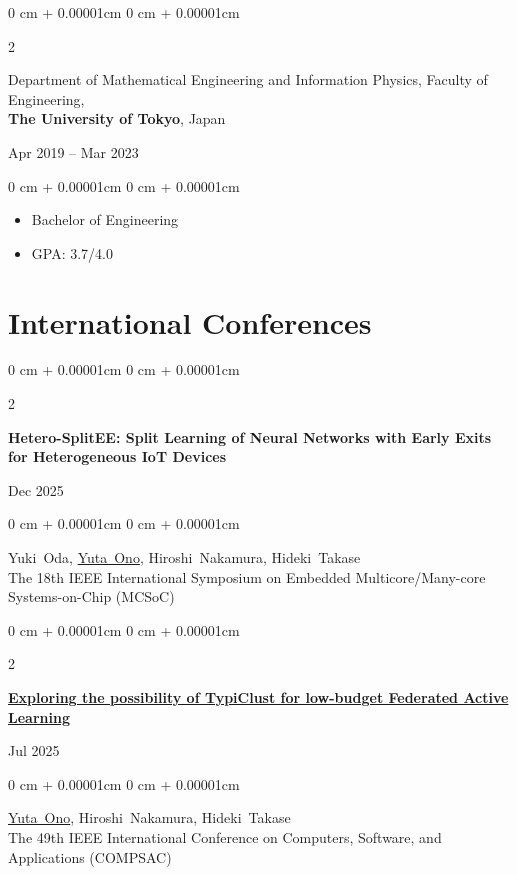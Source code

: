\documentclass[11pt, letterpaper]{article}
\newenvironment{highlights}{
    \begin{itemize}[
        topsep=0.0cm,
        parsep=0.0cm,
        partopsep=0pt,
        itemsep=0pt,
        leftmargin=10pt
    ]
}{
    \end{itemize}
} %
\newenvironment{onecolentry}{
    \begin{adjustwidth}{
        0 cm + 0.00001cm
    }{
        0 cm + 0.00001cm
    }
}{
    \end{adjustwidth}
} %
\newenvironment{twocolentry}[2][]{
    \onecolentry
    \def\secondColumn{#2}
    \setcolumnwidth{\fill, 3.5cm}
    \begin{paracol}{2}
}{
    \switchcolumn \raggedleft \secondColumn
    \end{paracol}
    \endonecolentry
} %
\begin{document}
    \begin{twocolentry}{Apr 2019 -- Mar 2023}
      Department of Mathematical Engineering and Information Physics, Faculty of Engineering,\\
      \textbf{The University of Tokyo}, Japan
    \end{twocolentry}
    \vspace{0.10cm}
    \begin{onecolentry}
      \begin{highlights}
        \item Bachelor of Engineering
        \item GPA: 3.7/4.0
      \end{highlights}
    \end{onecolentry}

    \section{International Conferences}
    \begin{samepage}
        \begin{twocolentry}{Dec 2025}
          \textbf{Hetero-SplitEE: Split Learning of Neural Networks with Early Exits for Heterogeneous IoT Devices}
        \end{twocolentry}
        \begin{onecolentry}
          \mbox{Yuki Oda}, \mbox{\underline{Yuta Ono}}, \mbox{Hiroshi Nakamura}, \mbox{Hideki Takase}\\
          The 18th IEEE International Symposium on Embedded Multicore/Many-core Systems-on-Chip (MCSoC)
        \end{onecolentry}
      \end{samepage}
      \vspace{0.15 cm}
      \begin{samepage}
        \begin{twocolentry}{Jul 2025}
          \textbf{\href{https://arxiv.org/abs/2505.19404}{Exploring the possibility of TypiClust for low-budget Federated Active Learning}}
        \end{twocolentry}
        \begin{onecolentry}
          \mbox{\underline{Yuta Ono}}, \mbox{Hiroshi Nakamura}, \mbox{Hideki Takase}\\
          The 49th IEEE International Conference on Computers, Software, and Applications (COMPSAC)
        \end{onecolentry}
      \end{samepage}
\end{document}
